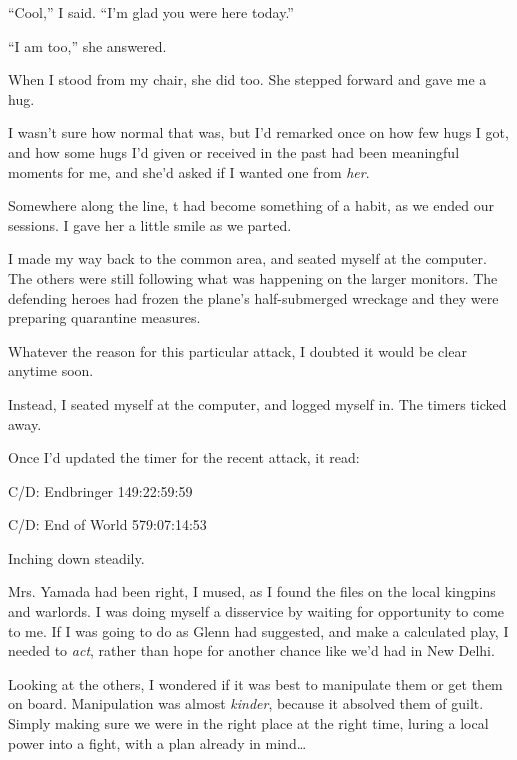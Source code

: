 ``Cool,'' I said.  ``I'm glad you were here today.''



``I am too,'' she answered.



When I stood from my chair, she did too.  She stepped forward and gave me a hug.



I wasn't sure how normal that was, but I'd remarked once on how few hugs I got, and how some hugs I'd given or received in the past had been meaningful moments for me, and she'd asked if I wanted one from \emph{her}.



Somewhere along the line, t had become something of a habit, as we ended our sessions.  I gave her a little smile as we parted.



I made my way back to the common area, and seated myself at the computer.  The others were still following what was happening on the larger monitors.  The defending heroes had frozen the plane's half-submerged wreckage and they were preparing quarantine measures.



Whatever the reason for this particular attack, I doubted it would be clear anytime soon.



Instead, I seated myself at the computer, and logged myself in.  The timers ticked away.



Once I'd updated the timer for the recent attack, it read:



C/D: Endbringer
149:22:59:59



C/D: End of World
579:07:14:53



Inching down steadily.



Mrs. Yamada had been right, I mused, as I found the files on the local kingpins and warlords.  I was doing myself a disservice by waiting for opportunity to come to me.  If I was going to do as Glenn had suggested, and make a calculated play, I needed to \emph{act}, rather than hope for another chance like we'd had in New Delhi.



Looking at the others, I wondered if it was best to manipulate them or get them on board.  Manipulation was almost \emph{kinder}, because it absolved them of guilt.  Simply making sure we were in the right place at the right time, luring a local power into a fight, with  a plan already in mind\ldots



